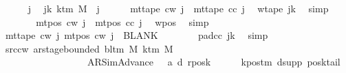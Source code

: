 \begin{isabellebody}
\ \ \ \ \isamarkupfalse%
\ j\ \isamarkupfalse%
\ jk{\isacharcolon}{\kern0pt}\ {\isachardoublequoteopen}k{\isacharunderscore}{\kern0pt}tm\ M\ {\isasymle}\ j{\isachardoublequoteclose}\isanewline
\ \ \ \ \isamarkupfalse%
\ {\isachardoublequoteopen}mt{\isacharunderscore}{\kern0pt}tape\ c{\isacharunderscore}{\kern0pt}w\ j\ {\isacharequal}{\kern0pt}\ mt{\isacharunderscore}{\kern0pt}tape\ c{\isacharunderscore}{\kern0pt}c\ j{\isachardoublequoteclose}\ \isamarkupfalse%
\ w{\isacharunderscore}{\kern0pt}tape\ jk\ \isamarkupfalse%
\ simp\isanewline
\ \ \ \ \isamarkupfalse%
\ \isamarkupfalse%
\ {\isachardoublequoteopen}mt{\isacharunderscore}{\kern0pt}pos\ c{\isacharunderscore}{\kern0pt}w\ j\ {\isacharequal}{\kern0pt}\ mt{\isacharunderscore}{\kern0pt}pos\ c{\isacharunderscore}{\kern0pt}c\ j{\isachardoublequoteclose}\ \isamarkupfalse%
\ w{\isacharunderscore}{\kern0pt}pos\ \isamarkupfalse%
\ simp\isanewline
\ \ \ \ \isamarkupfalse%
\ \isamarkupfalse%
\ {\isachardoublequoteopen}mt{\isacharunderscore}{\kern0pt}tape\ c{\isacharunderscore}{\kern0pt}w\ j\ {\isacharparenleft}{\kern0pt}mt{\isacharunderscore}{\kern0pt}pos\ c{\isacharunderscore}{\kern0pt}w\ j{\isacharparenright}{\kern0pt}\ {\isacharequal}{\kern0pt}\ BLANK{}{\isachardoublequoteclose}\isanewline
\ \ \ \ \ \ \isamarkupfalse%
\ pad{\isacharunderscore}{\kern0pt}cc\ jk\ \isamarkupfalse%
\ simp\isanewline
\ \ \isamarkupfalse%
\isanewline
\ \ \isamarkupfalse%
\ src{\isacharunderscore}{\kern0pt}cw{\isacharcolon}{\kern0pt}\ {\isachardoublequoteopen}ar{\isacharunderscore}{\kern0pt}stage{\isacharunderscore}{\kern0pt}bounded\ {\isacharparenleft}{\kern0pt}bl{\isacharunderscore}{\kern0pt}tm\ M{\isacharparenright}{\kern0pt}\ {\isacharparenleft}{\kern0pt}k{\isacharunderscore}{\kern0pt}tm\ M{\isacharparenright}{\kern0pt}\isanewline
\ \ \ \ \ \ \ \ \ \ \ \ \ \ \ \ \ \ {\isacharparenleft}{\kern0pt}AR{\isacharunderscore}{\kern0pt}SimAdvance{\isacharcomma}{\kern0pt}\ {}{\isacharcomma}{\kern0pt}\ {}{\isacharcomma}{\kern0pt}\ a{\isacharprime}{\kern0pt}{\isacharcomma}{\kern0pt}\ d{\isacharcomma}{\kern0pt}\ {\isacharquery}{\kern0pt}rposk{\isacharparenright}{\kern0pt}{\isachardoublequoteclose}\isanewline
\ \ \ \ \isamarkupfalse%
\ kpos{\isacharunderscore}{\kern0pt}tm\ dsupp\ posk{}{\isacharunderscore}{\kern0pt}tail\ \isamarkupfalse%

\end{isabellebody}
